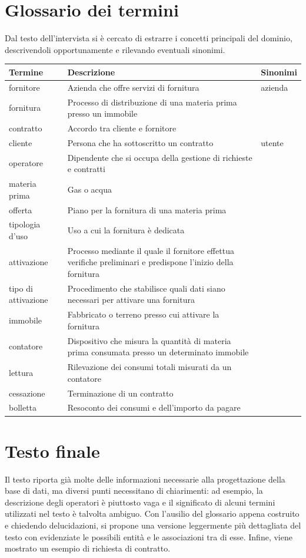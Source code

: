 \documentclass[a4paper,12pt]{report}
\begin{document}
\section{Glossario dei termini}
Dal testo dell'intervista si è cercato di estrarre i concetti principali del dominio, descrivendoli opportunamente e rilevando eventuali sinonimi.
\begin{longtable}{@{}p{3cm}| p{10cm} |p{3cm}@{}}
    \textbf{Termine} & \textbf{Descrizione} & \textbf{Sinonimi} \\ [0.5ex]
    \hline
    fornitore & Azienda che offre servizi di fornitura & azienda \\ 
    fornitura & Processo di distribuzione di una materia prima presso un immobile & \\
    contratto & Accordo tra cliente e fornitore & \\
    cliente & Persona che ha sottoscritto un contratto & utente \\
    operatore & Dipendente che si occupa della gestione di richieste e contratti & \\
    materia prima & Gas o acqua & \\
    offerta & Piano per la fornitura di una materia prima & \\
    tipologia d'uso & Uso a cui la fornitura è dedicata & \\
    attivazione & Processo mediante il quale il fornitore effettua verifiche preliminari e predispone l'inizio della fornitura & \\
    tipo di attivazione & Procedimento che stabilisce quali dati siano necessari per attivare una fornitura & \\
    immobile & Fabbricato o terreno presso cui attivare la fornitura & \\
    contatore & Dispositivo che misura la quantità di materia prima consumata presso un determinato immobile & \\
    lettura & Rilevazione dei consumi totali misurati da un contatore & \\
    cessazione & Terminazione di un contratto & \\
    bolletta & Resoconto dei consumi e dell'importo da pagare & \\
\end{longtable}

\section{Testo finale}
Il testo riporta già molte delle informazioni necessarie alla progettazione della base di dati, ma diversi punti necessitano di chiarimenti: ad esempio, la descrizione degli operatori è piuttosto vaga e il significato di alcuni termini utilizzati nel testo è talvolta ambiguo. Con l'ausilio del glossario appena costruito e chiedendo delucidazioni, si propone una versione leggermente più dettagliata del testo con evidenziate le possibili entità e le associazioni tra di esse. Infine, viene mostrato un esempio di richiesta di contratto.
\end{document}
